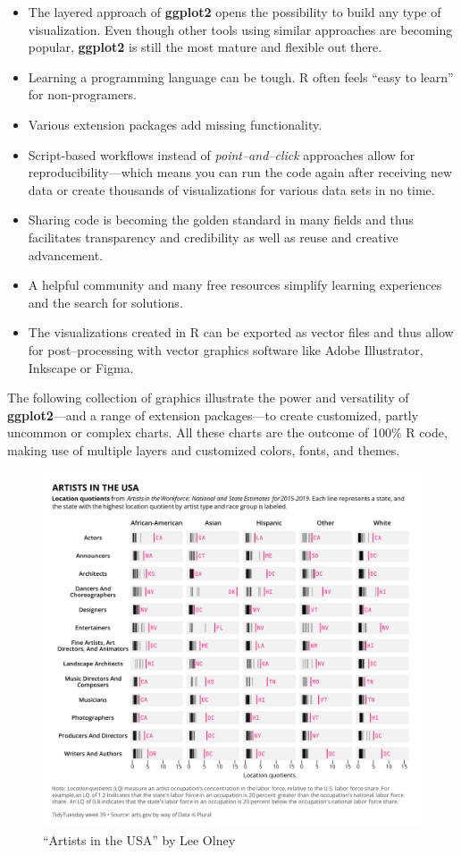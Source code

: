 \documentclass[
]{krantz}
\providecommand{\tightlist}{%
  \setlength{\itemsep}{0pt}\setlength{\parskip}{0pt}}
\begin{document}
\begin{itemize}
\tightlist
\item
  The layered approach of \textbf{ggplot2} opens the possibility to build any type of visualization. Even though other tools using similar approaches are becoming popular, \textbf{ggplot2} is still the most mature and flexible out there.
\item
  Learning a programming language can be tough. R often feels ``easy to learn'' for non-programers.
\item
  Various extension packages add missing functionality.
\item
  Script-based workflows instead of \emph{point--and--click} approaches allow for reproducibility---which means you can run the code again after receiving new data or create thousands of visualizations for various data sets in no time.
\item
  Sharing code is becoming the golden standard in many fields and thus facilitates transparency and credibility as well as reuse and creative advancement.
\item
  A helpful community and many free resources simplify learning experiences and the search for solutions.
\item
  The visualizations created in R can be exported as vector files and thus allow for post--processing with vector graphics software like Adobe Illustrator, Inkscape or Figma.
\end{itemize}

The following collection of graphics illustrate the power and versatility of \textbf{ggplot2}---and a range of extension packages---to create customized, partly uncommon or complex charts. All these charts are the outcome of 100\% R code, making use of multiple layers and customized colors, fonts, and themes.

\begin{figure}
\centering
\includegraphics{./img/showcase/artists-usa-lee-olney.png}
\caption{\label{fig:02imgVizArtistsUSA}``Artists in the USA'' by Lee Olney}
\end{figure}
\end{document}
